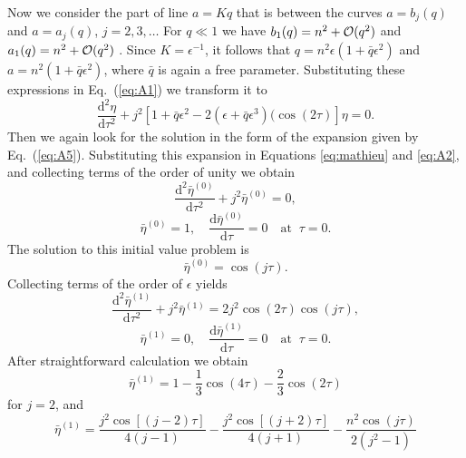 \documentclass[12pt]{ociamthesis}
\begin{document}
Now we consider the part of line $a = Kq$ that is between the curves $a = b_j(q)$ and $a = a_j(q)$, $j = 2,3,\dots$ For $q \ll 1$ we have $b_1(q) = n^2 + {\cal O}(q^2)$ and $a_1(q) = n^2 + {\cal O}(q^2)$ \citep{Abramowitz1965}. Since $K = \epsilon^{-1}$\/, it follows that $q = n^2\epsilon(1 + \bar q\epsilon^2)$ and $a = n^2(1 + \bar q\epsilon^2)$, where $\bar q$ is again a free parameter. Substituting these expressions in Eq.~(\ref{eq:A1}) we transform it to
%
\begin{equation}
\frac{\mathrm{d}^2\eta}{\mathrm{d}\tau^2} + j^2[1 + \bar q\epsilon^2 - 
   2(\epsilon + \bar q\epsilon^3)(\cos(2 \tau)] \eta = 0.
\label{eq:A18} 
\end{equation}
%
Then we again look for the solution in the form of the expansion given by Eq.~(\ref{eq:A5}). Substituting this expansion in Equations \eqref{eq:mathieu} and \eqref{eq:A2}, and collecting terms of the order of unity we obtain
%
\begin{equation}
\frac{\mathrm{d}^2\bar\eta^{(0)}}{\mathrm{d}\tau^2} + j^2\bar\eta^{(0)} = 0,
\label{eq:A19} 
\end{equation}
% 
\begin{equation}
\bar\eta^{(0)} = 1, \quad \frac{\mathrm{d}\bar\eta^{(0)}}{\mathrm{d}\tau} = 0 
   \quad \mbox{at} \;\; \tau = 0.
\label{eq:A20}
\end{equation}
%
The solution to this initial value problem is
% 
\begin{equation}
\bar\eta^{(0)} = \cos(j\tau).
\label{eq:A21}
\end{equation}
%
Collecting terms of the order of $\epsilon$ yields
%
\begin{equation}
\frac{\mathrm{d}^2\bar\eta^{(1)}}{\mathrm{d}\tau^2} + j^2\bar\eta^{(1)} = 
   2j^2\cos(2\tau)\cos(j\tau) ,
\label{eq:A22} 
\end{equation}
% 
\begin{equation}
\bar\eta^{(1)} = 0, \quad \frac{\mathrm{d}\bar\eta^{(1)}}{\mathrm{d}\tau} = 0 
   \quad \mbox{at} \;\; \tau = 0.
\label{eq:A23}
\end{equation}
%
After straightforward calculation we obtain
% 
\begin{equation}
\bar\eta^{(1)} = 1 - \frac13\cos(4\tau) - \frac23\cos(2\tau)
\label{eq:A24}
\end{equation}
%
for $j = 2$, and 
% 
\begin{equation}
\bar\eta^{(1)} = \frac{j^2\cos[(j-2)\tau]}{4(j - 1)} - 
   \frac{j^2\cos[(j+2)\tau]}{4(j + 1)} - \frac{n^2\cos(j\tau)}{2(j^2 - 1)}
\label{eq:A25}
\end{equation}
\end{document}

